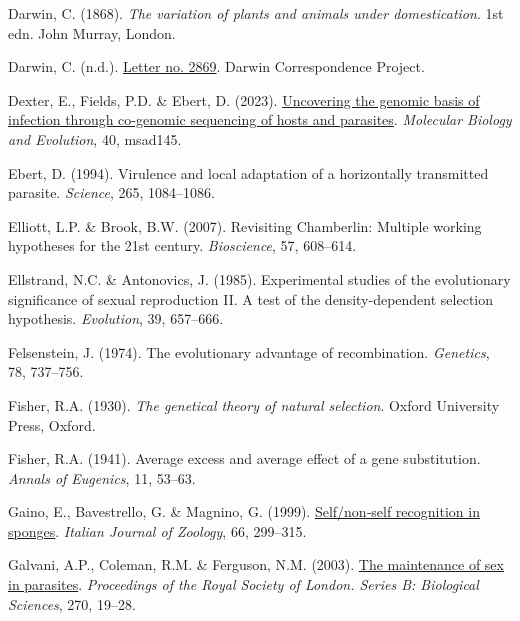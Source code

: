 \documentclass[
  american,
  letterpaper,
]{book}
\newlength{\cslhangindent}
\newenvironment{CSLReferences}[2] %
 {\begin{list}{}{%
  \setlength{\itemindent}{0pt}
  \setlength{\leftmargin}{0pt}
  \setlength{\parsep}{0pt}
  \ifodd #1
   \setlength{\leftmargin}{\cslhangindent}
   \setlength{\itemindent}{-1\cslhangindent}
  \fi
  \setlength{\itemsep}{#2\baselineskip}}}
 {\end{list}}
\begin{document}
\begin{CSLReferences}{1}{0}
Darwin, C. (1868). \emph{The variation of plants and animals under
domestication}. 1st edn. John Murray, London.

Darwin, C. (n.d.).
\href{https://www.darwinproject.ac.uk/letter/?docId=letters/DCP-LETT-2869.xml}{Letter
no. 2869}. Darwin Correspondence Project.

Dexter, E., Fields, P.D. \& Ebert, D. (2023).
\href{https://doi.org/10.1093/molbev/msad145}{Uncovering the genomic
basis of infection through co-genomic sequencing of hosts and
parasites}. \emph{Molecular Biology and Evolution}, 40, msad145.

Ebert, D. (1994). Virulence and local adaptation of a horizontally
transmitted parasite. \emph{Science}, 265, 1084--1086.

Elliott, L.P. \& Brook, B.W. (2007). Revisiting {C}hamberlin: Multiple
working hypotheses for the 21st century. \emph{Bioscience}, 57,
608--614.

Ellstrand, N.C. \& Antonovics, J. (1985). Experimental studies of the
evolutionary significance of sexual reproduction II. A test of the
density-dependent selection hypothesis. \emph{Evolution}, 39, 657--666.

Felsenstein, J. (1974). The evolutionary advantage of recombination.
\emph{Genetics}, 78, 737--756.

Fisher, R.A. (1930). \emph{The genetical theory of natural selection}.
Oxford University Press, Oxford.

Fisher, R.A. (1941). Average excess and average effect of a gene
substitution. \emph{Annals of Eugenics}, 11, 53--63.

Gaino, E., Bavestrello, G. \& Magnino, G. (1999).
\href{https://doi.org/10.1080/11250009909356270}{Self/non‐self
recognition in sponges}. \emph{Italian Journal of Zoology}, 66,
299--315.

Galvani, A.P., Coleman, R.M. \& Ferguson, N.M. (2003).
\href{https://doi.org/10.1098/rspb.2002.2182}{The maintenance of sex in
parasites}. \emph{Proceedings of the Royal Society of London. Series B:
Biological Sciences}, 270, 19--28.


\end{CSLReferences}
\end{document}
